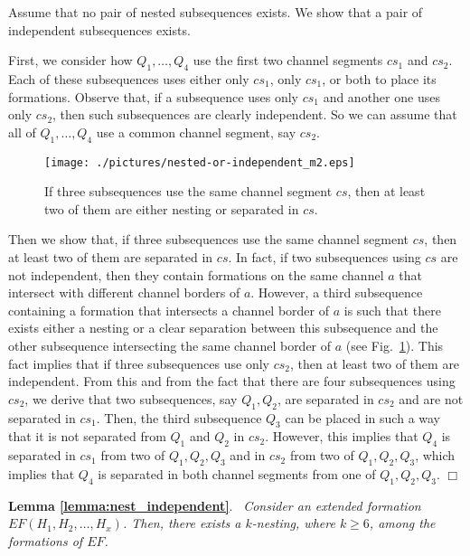 \documentclass[a4paper,10pt]{llncs}
\renewenvironment{proof}
{{\bf Proof:}}{\hspace*{\fill}$\Box$\par\vspace{2mm}}
\newcommand{\rephrase}[3]{\noindent\textbf{#1 #2}.~\emph{#3}}
\begin{document}
\begin{proof}
Assume that no pair of nested subsequences exists. We show that a pair of independent subsequences exists.

First, we consider how $Q_1,\ldots ,Q_4$ use the first two channel segments $cs_1$ and $cs_2$. Each of these subsequences uses either only $cs_1$, only $cs_1$, or both to place its formations. Observe that, if a subsequence uses only $cs_1$ and another one uses only $cs_2$, then such subsequences are clearly independent. So we can assume that all of $Q_1,\ldots ,Q_4$ use a common channel segment, say $cs_2$.

\begin{figure}[ht]
\begin{center}
\texttt{[image: ./pictures/nested-or-independent\_m2.eps]}
\caption{If three subsequences use the same channel segment $cs$, then at least two of them are either nesting or separated in $cs$.}
\label{fig:nested-or-independent}
\end{center}
\end{figure}

Then we show that, if three subsequences use the same channel segment $cs$, then at least two of them are separated in $cs$. In fact, if two subsequences using $cs$ are not independent, then they contain formations on the same channel $a$ that intersect with different channel borders of $a$. However, a third subsequence containing a formation that intersects a channel border of $a$ is such that there exists either a nesting or a clear separation between this subsequence and the other subsequence intersecting the same channel border of $a$ (see Fig.~\ref{fig:nested-or-independent}). This fact implies that if three subsequences use only $cs_2$, then at least two of them are independent. From this and from the fact that there are four subsequences using $cs_2$, we derive that two subsequences, say $Q_1,Q_2$, are separated in $cs_2$ and are not separated in $cs_1$. Then, the third subsequence $Q_3$ can be placed in such a way that it is not separated from $Q_1$ and $Q_2$ in $cs_2$. However, this implies that $Q_4$ is separated in $cs_1$ from two of $Q_1,Q_2,Q_3$ and in $cs_2$ from two of $Q_1,Q_2,Q_3$, which implies that $Q_4$ is separated in both channel segments from one of $Q_1,Q_2,Q_3$.
\end{proof}

\rephrase{Lemma}{\ref{lemma:nest_independent}}{
Consider an extended formation $EF(H_1,H_2,\ldots,H_x)$.
Then, there exists a $k$-nesting, where $k \geq 6$, among the formations of $EF$.
}
\end{document}
